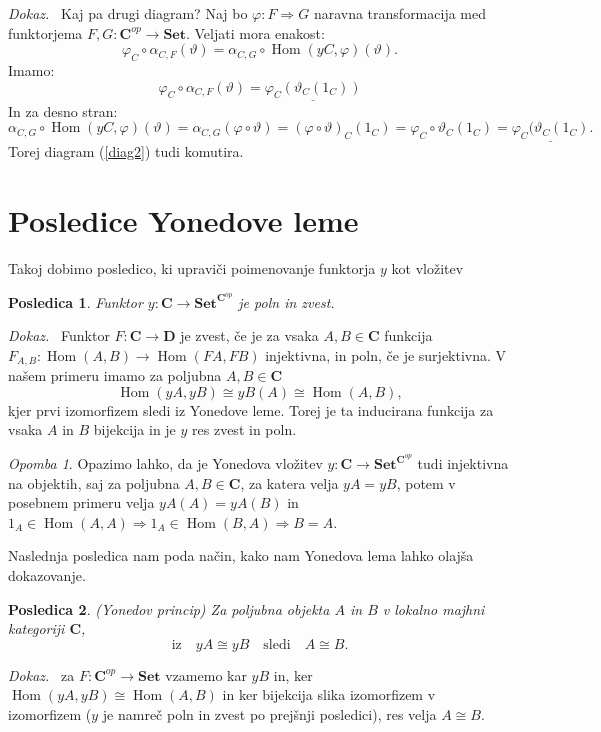 \documentclass[12pt,a4paper]{book}
\theoremstyle{definition}
\theoremstyle{plain}
\newtheorem{posledica}{Posledica}[definicija]
\newenvironment{dokaz}{\emph{Dokaz.}\ }{\hspace{\fill}{$\Box$}}
\theoremstyle{definition}
\theoremstyle{remark}
\newtheorem*{opomba}{Opomba}
\newcommand{\cat}[1]{\textbf{#1}}
\DeclareMathOperator{\Hom}{Hom}
\begin{document}
\begin{dokaz}
Kaj pa drugi diagram? Naj bo $\varphi : F \Rightarrow G$ naravna transformacija med funktorjema $F,G : \cat{C}^{op} \to \cat{Set}$.
Veljati mora enakost:
$$\varphi_C \circ \alpha_{C,F}(\vartheta) = \alpha_{C,G} \circ \Hom(yC,\varphi)(\vartheta).$$
Imamo:
$$\varphi_C \circ \alpha_{C,F}(\vartheta) = \underline{\varphi_C(\vartheta_C(1_C))}$$
In za desno stran:
$$\alpha_{C,G} \circ \Hom(yC,\varphi)(\vartheta) = \alpha_{C,G}(\varphi \circ \vartheta) = 
(\varphi \circ \vartheta)_C(1_C) = \varphi_C \circ \vartheta_C(1_C) = \underline{\varphi_C(\vartheta_C(1_C)}.$$
Torej diagram (\ref{diag2}) tudi komutira.

\end{dokaz}

\section{Posledice Yonedove leme}

Takoj dobimo posledico, ki upraviči poimenovanje funktorja $y$ kot vložitev
\begin{posledica} Funktor $y : \cat{C} \to \cat{Set}^{\cat{C}^{op}}$ je poln in zvest.
\end{posledica}
\begin{dokaz}
Funktor $F:\cat{C} \to \cat{D}$ je zvest, če je za vsaka $A,B \in \cat{C}$ funkcija $F_{A,B} : \Hom(A,B) \to \Hom(FA,FB)$ injektivna, in poln, če je surjektivna.
V našem primeru imamo za poljubna $A,B \in \cat{C}$ 
$$\Hom(yA,yB) \cong yB(A) \cong \Hom(A,B),$$
kjer prvi izomorfizem sledi iz Yonedove leme. Torej je ta inducirana funkcija za vsaka $A$ in $B$ bijekcija in je $y$ res zvest in poln.
\end{dokaz}
\begin{opomba}
Opazimo lahko, da je Yonedova vložitev $y : \cat{C} \to \cat{Set}^{\cat{C}^{op}}$ tudi injektivna na objektih, saj za poljubna $A,B \in \cat{C}$, za katera velja $yA = yB$, potem v posebnem primeru velja $yA(A) = yA(B)$ in $1_A \in \Hom(A,A) \Rightarrow 1_A \in \Hom(B,A) \Rightarrow B = A$.
\end{opomba}


Naslednja posledica nam poda način, kako nam Yonedova lema lahko olajša dokazovanje.

\begin{posledica} \emph{(Yonedov princip)}
Za poljubna objekta $A$ in $B$ v lokalno majhni kategoriji $\cat{C}$,
$$\text{iz} \quad yA \cong yB \quad\text{sledi}\quad A \cong B .$$
\end{posledica}
\begin{dokaz}
za $F : \cat{C}^{op} \to \cat{Set}$ vzamemo kar $yB$ in, ker $\Hom(yA,yB) \cong \Hom(A,B)$ in ker bijekcija slika izomorfizem v izomorfizem ($y$ je namreč poln in zvest po prejšnji posledici), res velja $A \cong B$.
\end{dokaz}
\end{document}
